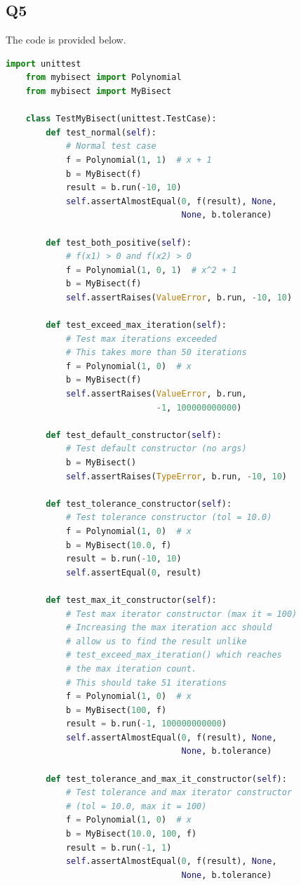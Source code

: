\documentclass[12pt, letterpaper, titlepage]{article}
\begin{document}
\subsection*{Q5}
The code is provided below.
\begin{lstlisting}[language=Python, style=code_style]
    import unittest
    from mybisect import Polynomial
    from mybisect import MyBisect
    
    class TestMyBisect(unittest.TestCase):
        def test_normal(self):
            # Normal test case
            f = Polynomial(1, 1)  # x + 1
            b = MyBisect(f)
            result = b.run(-10, 10)
            self.assertAlmostEqual(0, f(result), None, 
                                   None, b.tolerance)
    
        def test_both_positive(self):
            # f(x1) > 0 and f(x2) > 0
            f = Polynomial(1, 0, 1)  # x^2 + 1
            b = MyBisect(f)
            self.assertRaises(ValueError, b.run, -10, 10)
    
        def test_exceed_max_iteration(self):
            # Test max iterations exceeded
            # This takes more than 50 iterations
            f = Polynomial(1, 0)  # x
            b = MyBisect(f)
            self.assertRaises(ValueError, b.run, 
                              -1, 100000000000)
    
        def test_default_constructor(self):
            # Test default constructor (no args)
            b = MyBisect()
            self.assertRaises(TypeError, b.run, -10, 10)
    
        def test_tolerance_constructor(self):
            # Test tolerance constructor (tol = 10.0)
            f = Polynomial(1, 0)  # x
            b = MyBisect(10.0, f)
            result = b.run(-10, 10)
            self.assertEqual(0, result)
    
        def test_max_it_constructor(self):
            # Test max iterator constructor (max it = 100)
            # Increasing the max iteration acc should
            # allow us to find the result unlike
            # test_exceed_max_iteration() which reaches
            # the max iteration count.
            # This should take 51 iterations
            f = Polynomial(1, 0)  # x
            b = MyBisect(100, f)
            result = b.run(-1, 100000000000)
            self.assertAlmostEqual(0, f(result), None, 
                                   None, b.tolerance)
    
        def test_tolerance_and_max_it_constructor(self):
            # Test tolerance and max iterator constructor
            # (tol = 10.0, max it = 100)
            f = Polynomial(1, 0)  # x
            b = MyBisect(10.0, 100, f)
            result = b.run(-1, 1)
            self.assertAlmostEqual(0, f(result), None, 
                                   None, b.tolerance)
    

\end{lstlisting}
\end{document}
